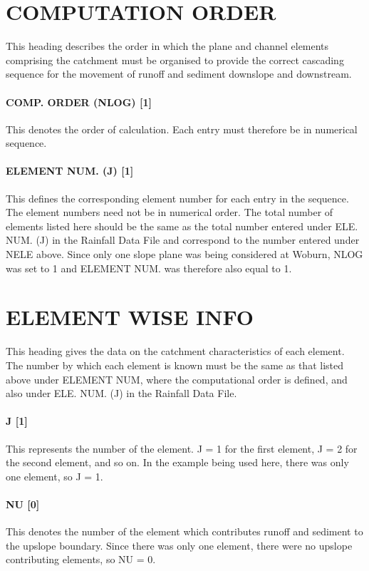 \section{COMPUTATION ORDER}
\label{sec:COMPUTATIONORDER}

This heading describes the order in which the plane and channel elements comprising the catchment must be organised to provide the correct cascading sequence for the movement of runoff and sediment downslope and downstream.
 
\paragraph{COMP. ORDER (NLOG) [1]}
This denotes the order of calculation. Each entry must therefore be in numerical sequence.
 
\paragraph{ELEMENT NUM. (J) [1]}
This defines the corresponding element number for each entry in the sequence. The element numbers need not be in numerical order. The total number of elements listed here should be the same as the total number entered under ELE. NUM. (J) in the Rainfall Data File and correspond to the number entered under NELE above. Since only one slope plane was being considered at Woburn, NLOG was set to 1 and ELEMENT NUM. was therefore also equal to 1.
 
\section{ELEMENT WISE INFO}
\label{sec:ELEMENTWISEINFO}

This heading gives the data on the catchment characteristics of each element. The number by which each element is known must be the same as that listed above under ELEMENT NUM, where the computational order is defined, and also under ELE. NUM. (J) in the Rainfall Data File.
 
\paragraph{J [1]}
This represents the number of the element. J = 1 for the first element, J = 2 for the second element, and so on. In the example being used here, there was only one element, so J = 1.
 
\paragraph{NU [0]}
This denotes the number of the element which contributes runoff and sediment to the upslope boundary. Since there was only one element, there were no upslope contributing elements, so NU = 0.
 

